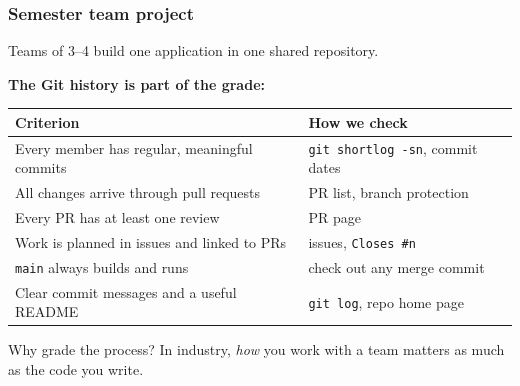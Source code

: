 \documentclass[aspectratio=169,10pt,compress]{beamer}
\newcommand{\cmd}[1]{\texttt{\color{gitred}#1}}
\begin{document}
\begin{frame}[t,fragile] \frametitle{Semester team project}
  Teams of 3--4 build one application in one shared repository.

  \vspace{0.5em}
  \textbf{The Git history is part of the grade:}
  \vspace{0.3em}

  \small
  \begin{tabular}{@{}L{0.62\textwidth}L{0.3\textwidth}@{}}
    \toprule
    \textbf{Criterion} & \textbf{How we check} \\
    \midrule
    Every member has regular, meaningful commits & \cmd{git shortlog -sn}, commit dates \\
    All changes arrive through pull requests & PR list, branch protection \\
    Every PR has at least one review & PR page \\
    Work is planned in issues and linked to PRs & issues, \texttt{Closes \#n} \\
    \texttt{main} always builds and runs & check out any merge commit \\
    Clear commit messages and a useful README & \cmd{git log}, repo home page \\
    \bottomrule
  \end{tabular}

  \vspace{0.5em}
  \normalsize
  \begin{block}{Why grade the process?}
    In industry, \emph{how} you work with a team matters as much as the code you write.
  \end{block}
\end{frame}
\end{document}
